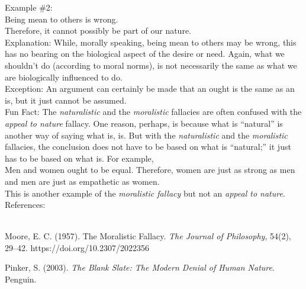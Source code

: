 \documentclass[a4paper,12pt,single,pdftex]{scrbook}
\begin{document}
{      
        Example \#2:
      \\

      
        Being mean to others is wrong.
      \\

      
        Therefore, it cannot possibly be part of our nature.
      \\

      
        Explanation: While, morally speaking, being mean to others may be wrong, this has no bearing on the biological aspect of the desire or need. Again, what we shouldn’t do (according to moral norms), is not necessarily the same as what we are biologically influenced to do.
      \\

      
        Exception: An argument can certainly be made that an ought is the same as an is, but it just cannot be assumed.
      \\

      
        Fun Fact: The {\it naturalistic} and the {\it moralistic}  fallacies are often confused with the {\it appeal to nature}  fallacy. One reason, perhaps, is because what is “natural” is another way of saying what is, is. But with the {\it naturalistic} and the {\it moralistic}  fallacies, the conclusion does not have to be based on what is “natural;” it just has to be based on what is. For example,
      \\

      
        Men and women ought to be equal. Therefore, women are just as strong as men and men are just as empathetic as women.
      \\

      
        This is another example of the {\it moralistic fallacy} but not an {\it appeal to nature}.
      \\

    
    References:

    
      
        
      \\

      
        
          Moore, E. C. (1957). The Moralistic Fallacy. {\it The Journal of Philosophy}, 54(2), 29–42. https://doi.org/10.2307/2022356
        
        
          Pinker, S. (2003). {\it The Blank Slate: The Modern Denial of Human Nature}. Penguin.
        
      
    
  }
\end{document}
